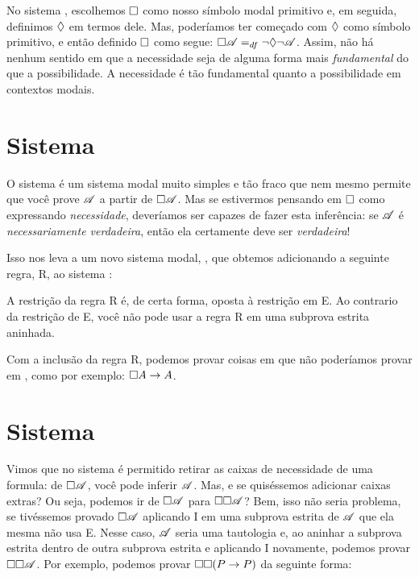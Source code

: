 No sistema   \mlK, escolhemos $\Box$ como nosso símbolo modal primitivo e, em seguida, definimos $\Diamond$ em termos dele. Mas, poderíamos ter começado com $\Diamond$ como símbolo  primitivo, e então definido $\Box$ como segue: $\Box\mathscr{A} =_{df} \neg \Diamond \neg \mathscr{A}$. 
Assim,  não há nenhum sentido em que a necessidade seja de alguma forma mais \emph{fundamental} do que a possibilidade. A necessidade é tão fundamental quanto a possibilidade em contextos modais.

\section{Sistema \mlT}
\label{T}

O sistema  \mlK{}   é um sistema modal muito simples e  tão fraco que nem mesmo permite que você prove $\mathscr{A}$  a partir de $\Box\mathscr{A}$.  Mas se estivermos pensando em $\Box$ como expressando \emph{necessidade}, deveríamos ser capazes de fazer esta inferência: se $\mathscr{A}$ é \emph{necessariamente verdadeira}, então ela certamente deve ser  \emph{verdadeira}!

 

Isso nos leva a um novo sistema modal, \mlT, que obtemos adicionando a
seguinte regra, R\mlT, ao sistema \mlK:

A restrição da regra R\mlT{} é, de certa forma, oposta à restrição em \ebox E.  Ao contrario da restrição de  \ebox E, você  não pode usar  a regra R\mlT{} em uma subprova estrita aninhada.


Com a inclusão da regra R\mlT{}, podemos provar coisas em \mlT{} que não poderíamos provar em \mlK, como por exemplo:  $\Box A \rightarrow A$.

\section{Sistema \mlSfour}
\label{S4}

Vimos que no sistema \mlT{} é permitido retirar as caixas de necessidade de uma formula: de $\Box \mathscr{A}$, você pode inferir $\mathscr{A}$. Mas, e se quiséssemos adicionar caixas extras?  Ou seja, podemos ir de $\Box\mathscr{A}$ para $\Box\Box\mathscr{A}$? Bem, isso não seria problema, se tivéssemos provado $\Box\mathscr{A}$ aplicando \ebox I em uma subprova estrita de $\mathscr{A}$ que ela mesma não usa \ebox E. Nesse caso, $\mathscr{A}$ seria uma tautologia e, ao aninhar a subprova estrita dentro de outra subprova estrita e aplicando \ebox I novamente, podemos provar $\Box\Box \mathscr{A}$. Por exemplo, podemos provar $\Box\Box (P\rightarrow P)$ da seguinte forma:
 

